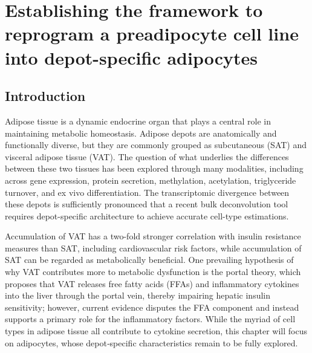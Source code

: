 \chapter{Establishing the framework to reprogram a preadipocyte cell line into depot-specific adipocytes
}\label{chap:chapter 3}


\section{Introduction}

Adipose tissue is a dynamic endocrine organ that plays a central role in maintaining metabolic homeostasis. Adipose depots are anatomically and functionally diverse, but they are commonly grouped as subcutaneous (SAT) and visceral adipose tissue (VAT). The question of what underlies the differences between these two tissues has been explored through many modalities, including across gene expression\cite{Gesta2006-so,Tchoukalova2010-ea}, protein secretion\cite{Wajchenberg2002-pt,Roca-Rivada2015-ee,Kahn2022-tq}, methylation\cite{McAllan2023-qo}, acetylation\cite{Navarro-Ruiz2022-xi}, triglyceride turnover\cite{Spalding2017-lr}, and ex vivo differentiation\cite{Macotela2012-wy,Laber2023-qe}. The transcriptomic divergence between these depots is sufficiently pronounced that a recent bulk deconvolution tool requires depot-specific architecture to achieve accurate cell-type estimations\cite{Sorek2024-ah}.   

Accumulation of VAT has a two-fold stronger correlation with insulin resistance measures than SAT, including cardiovascular risk factors\cite{Preis2010-eh}, while accumulation of SAT can be regarded as metabolically beneficial\cite{Tran2008-cw}. One prevailing hypothesis of why VAT contributes more to metabolic dysfunction is the portal theory, which proposes that VAT releases free fatty acids (FFAs) and inflammatory cytokines into the liver through the portal vein, thereby impairing hepatic insulin sensitivity; however, current evidence disputes the FFA component and instead supports a primary role for the inflammatory factors\cite{Sakers2022-wb,Item2012-mg}. While the myriad of cell types in adipose tissue all contribute to cytokine secretion, this chapter will focus on adipocytes, whose depot‑specific characteristics remain to be fully explored.   

